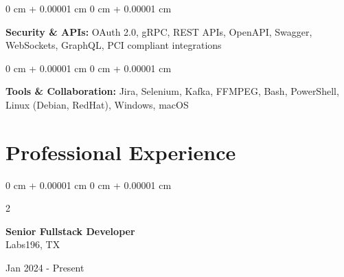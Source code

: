 \documentclass[10pt, letterpaper]{article}
\newenvironment{onecolentry}{
    \begin{adjustwidth}{
        0 cm + 0.00001 cm
    }{
        0 cm + 0.00001 cm
    }
}{
    \end{adjustwidth}
} %
\newenvironment{twocolentry}[2][]{
    \onecolentry
    \def\secondColumn{#2}
    \setcolumnwidth{\fill, 4.5 cm}
    \begin{paracol}{2}
}{
    \switchcolumn \raggedleft \secondColumn
    \end{paracol}
    \endonecolentry
} %
\begin{document}
\begin{onecolentry}
	\textbf{Security \& APIs:} OAuth 2.0, gRPC, REST APIs, OpenAPI, Swagger, WebSockets, GraphQL, PCI compliant integrations
\end{onecolentry}

\begin{onecolentry}
	\textbf{Tools \& Collaboration:} Jira, Selenium, Kafka, FFMPEG, Bash, PowerShell, Linux (Debian, RedHat), Windows, macOS
\end{onecolentry}





\section{Professional Experience}

\begin{twocolentry}{
	Jan 2024 - Present
}
\textbf{Senior Fullstack Developer}\\
Labs196, TX
\end{twocolentry}
\end{document}
